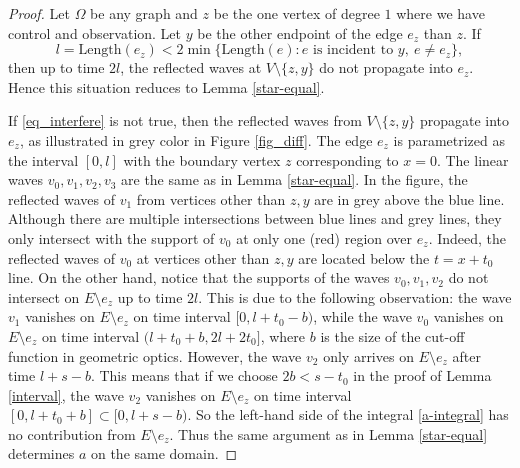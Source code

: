\documentclass[11pt]{amsart}
\theoremstyle{definition}
\theoremstyle{plain}
\numberwithin{equation}{section}
\begin{document}
\begin{proof}
Let $\Omega$ be any graph  and $z$ be the one vertex of degree $1$ where we have control and observation. 
Let $y$ be the other endpoint of the edge $e_z$ than $z$.
If 
\begin{equation} \label{eq_interfere}
l=\textrm{Length}(e_z)< 2 \min\Big\{ \textrm{Length}(e): e \textrm{ is incident to } y, \ e\neq e_z \Big\},
\end{equation}
then up to time $2l$, the reflected waves at $V\setminus \{z,y\}$ do not propagate into $e_z$. Hence this situation reduces to Lemma \ref{star-equal}. 

If \eqref{eq_interfere} is not true, then the reflected waves from $V\setminus \{z,y\}$ propagate into $e_z$, as illustrated in grey color in Figure \ref{fig_diff}. 
The edge $e_z$ is parametrized as the interval $[0,l]$ with the boundary vertex $z$ corresponding to $x=0$.
The linear waves $v_0,v_1,v_2,v_3$ are the same as in Lemma \ref{star-equal}.
In the figure, the reflected waves of $v_1$ from vertices other than $z,y$ are in grey above the blue line.
Although there are multiple intersections between blue lines and grey lines, they only intersect with the support of $v_0$ at only one (red) region over $e_z$. 
Indeed, the reflected waves of $v_0$ at vertices other than $z,y$ are located below the $t=x+t_0$ line.
On the other hand, notice that the supports of the waves $v_0,v_1,v_2$ do not intersect on $E\setminus e_z$ up to time $2l$.
This is due to the following observation: the wave $v_1$ vanishes on $E\setminus e_z$ on time interval $[0,l+t_0-b)$, while the wave $v_0$ vanishes on $E\setminus e_z$ on time interval $(l+t_0+b,2l+2t_0]$, where $b$ is the size of the cut-off function in geometric optics.
However, the wave $v_2$ only arrives on $E\setminus e_z$ after time $l+s-b$. This means that if we choose $2b<s-t_0$ in the proof of Lemma \ref{interval}, the wave $v_2$ vanishes on $E\setminus e_z$ on time interval $[0,l+t_0+b] \subset [0,l+s-b)$.
So the left-hand side of the integral \eqref{a-integral} has no contribution from $E\setminus e_z$.
Thus the same argument as in Lemma \ref{star-equal} determines $a$ on the same domain.
\end{proof}
\end{document}
